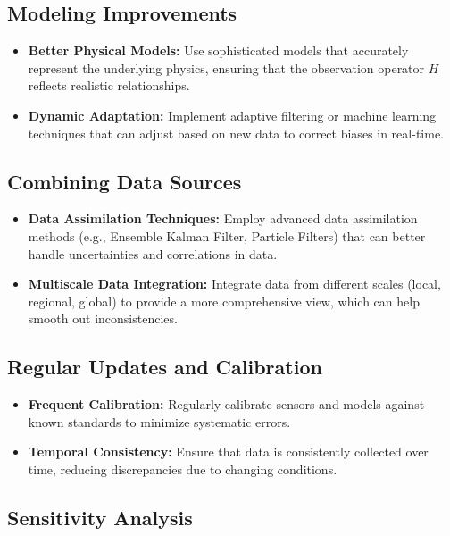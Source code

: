 \documentclass{article}
\begin{document}
\subsection{Modeling Improvements}

\begin{itemize}
    \item \textbf{Better Physical Models:} Use sophisticated models that accurately represent the underlying physics, ensuring that the observation operator \( H \) reflects realistic relationships.
    
    \item \textbf{Dynamic Adaptation:} Implement adaptive filtering or machine learning techniques that can adjust based on new data to correct biases in real-time.
\end{itemize}

\subsection{Combining Data Sources}

\begin{itemize}
    \item \textbf{Data Assimilation Techniques:} Employ advanced data assimilation methods (e.g., Ensemble Kalman Filter, Particle Filters) that can better handle uncertainties and correlations in data.
    
    \item \textbf{Multiscale Data Integration:} Integrate data from different scales (local, regional, global) to provide a more comprehensive view, which can help smooth out inconsistencies.
\end{itemize}

\subsection{Regular Updates and Calibration}

\begin{itemize}
    \item \textbf{Frequent Calibration:} Regularly calibrate sensors and models against known standards to minimize systematic errors.
    
    \item \textbf{Temporal Consistency:} Ensure that data is consistently collected over time, reducing discrepancies due to changing conditions.
\end{itemize}

\subsection{Sensitivity Analysis}
\end{document}
